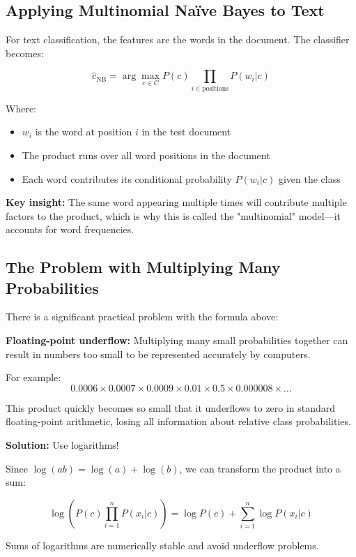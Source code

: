 \documentclass[11pt,a4paper]{article}
\theoremstyle{definition}
\theoremstyle{plain}
\theoremstyle{remark}
\begin{document}
\subsection{Applying Multinomial Naïve Bayes to Text}

For text classification, the features are the words in the document. The classifier becomes:

\[
\hat{c}_{\text{NB}} = \arg\max_{c \in C} P(c) \prod_{i \in \text{positions}} P(w_i | c)
\]

Where:
\begin{itemize}
    \item $w_i$ is the word at position $i$ in the test document
    \item The product runs over all word positions in the document
    \item Each word contributes its conditional probability $P(w_i | c)$ given the class
\end{itemize}

\textbf{Key insight:} The same word appearing multiple times will contribute multiple factors to the product, which is why this is called the "multinomial" model—it accounts for word frequencies.

\subsection{The Problem with Multiplying Many Probabilities}

There is a significant practical problem with the formula above:

\textbf{Floating-point underflow:}
Multiplying many small probabilities together can result in numbers too small to be represented accurately by computers.

For example:
\[
0.0006 \times 0.0007 \times 0.0009 \times 0.01 \times 0.5 \times 0.000008 \times \ldots
\]

This product quickly becomes so small that it underflows to zero in standard floating-point arithmetic, losing all information about relative class probabilities.

\textbf{Solution:} Use logarithms!

Since $\log(ab) = \log(a) + \log(b)$, we can transform the product into a sum:

\[
\log\left(P(c) \prod_{i=1}^{n} P(x_i | c)\right) = \log P(c) + \sum_{i=1}^{n} \log P(x_i | c)
\]

Sums of logarithms are numerically stable and avoid underflow problems.
\end{document}
